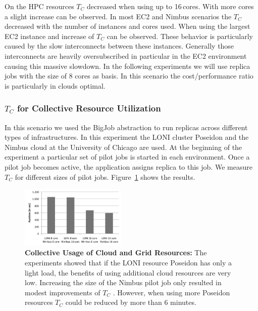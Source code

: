 \documentclass[conference,final]{IEEEtran}
\newcommand{\tc}{$T_{C}$ }
\begin{document}
On the HPC resources \tc decreased when using up to 16\,cores. With more cores a slight increase can
be observed. In most EC2 and Nimbus scenarios the \tc decreased with the number of instances and cores
used. When using the largest EC2 instance and increase of \tc can be observed. These behavior is particularly
caused by the slow interconnects between these instances. Generally those interconnects are heavily oversubscribed
in particular in the EC2 environment causing this massive slowdown. In the following experiments we 
will use replica jobs with the size of 8 cores as basis. In this scenario the cost/performance
ratio is particularly in clouds optimal. 

\subsubsection{\tc for Collective Resource Utilization}

In this scenario we used the BigJob abstraction to run replicas across different types of
infrastructures. In this experiment the LONI cluster Poseidon and the Nimbus cloud at the University
of Chicago are used. At the beginning of the experiment a particular set of pilot jobs is started
in each environment. Once a pilot job becomes active, the application assigns replica to 
this job. We measure \tc for different sizes of pilot jobs. Figure~\ref{fig:performance_8replica_scenario_poseidon_nimbus}
shows the results.

\begin{figure}[htbp]
    \centering
        \includegraphics[width=0.45\textwidth]{performance/8replica_scenario_poseidon_nimbus}
    \caption{\textbf{Collective Usage of Cloud and Grid Resources: }  The experiments showed that if the LONI resource
             Poseidon has only a light load, the benefits of using additional cloud resources are very low. Increasing
             the size of the Nimbus pilot job only resulted in modest improvements of \tc. However, when using more Poseidon
             resources \tc could be reduced by more than 6 minutes.}
    \label{fig:performance_8replica_scenario_poseidon_nimbus}
\end{figure}
\end{document}
